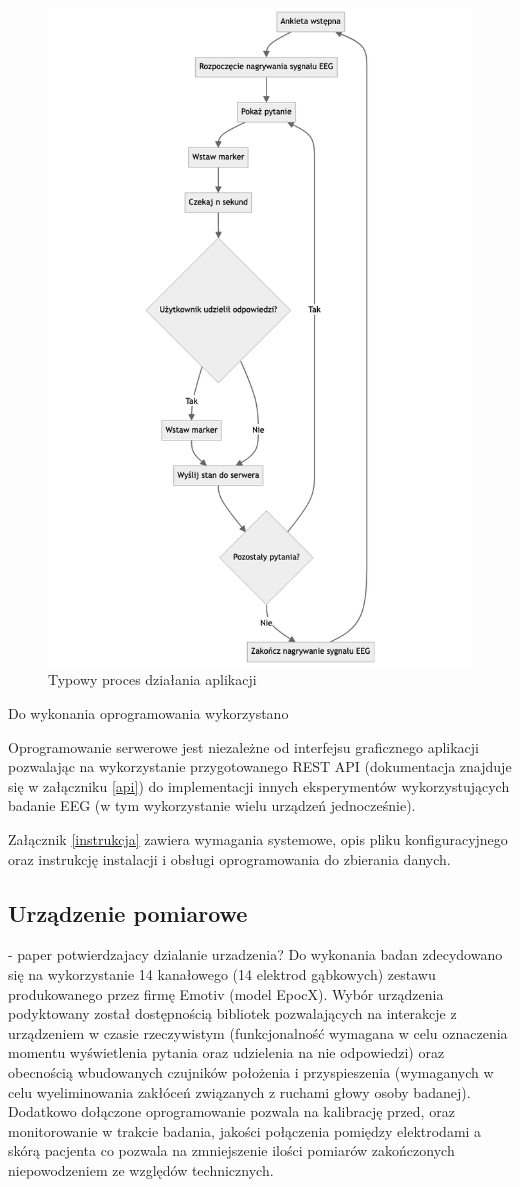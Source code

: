 \documentclass{./assets/wfis}
\begin{document}
\begin{figure}[h!]
    \centering
    \includegraphics[width=0.5\columnwidth]{thesis/assets/app_flow_diagram.png}
    \caption{Typowy proces działania aplikacji}
    \label{fig:app-flow}
\end{figure}

Do wykonania oprogramowania wykorzystano

Oprogramowanie serwerowe jest niezależne od interfejsu graficznego aplikacji pozwalając na wykorzystanie przygotowanego REST API (dokumentacja znajduje się w załączniku \ref{api}) do implementacji innych eksperymentów wykorzystujących badanie EEG (w tym wykorzystanie wielu urządzeń jednocześnie).

Załącznik \ref{instrukcja} zawiera wymagania systemowe, opis pliku konfiguracyjnego oraz instrukcję instalacji i obsługi oprogramowania do zbierania danych.

\subsection{Urządzenie pomiarowe}\label{emotiv}
- paper potwierdzajacy dzialanie urzadzenia?
Do wykonania badan zdecydowano się na wykorzystanie 14 kanałowego (14 elektrod gąbkowych)  zestawu produkowanego przez firmę Emotiv (model EpocX). Wybór urządzenia podyktowany został dostępnością bibliotek pozwalających na interakcje z urządzeniem w czasie rzeczywistym (funkcjonalność wymagana w celu oznaczenia momentu wyświetlenia pytania oraz udzielenia na nie odpowiedzi) oraz obecnością wbudowanych czujników położenia i przyspieszenia (wymaganych w celu wyeliminowania zakłóceń związanych z ruchami głowy osoby badanej). Dodatkowo dołączone oprogramowanie pozwala na kalibrację przed, oraz monitorowanie w trakcie badania, jakości połączenia pomiędzy elektrodami a skórą pacjenta co pozwala na zmniejszenie ilości pomiarów zakończonych niepowodzeniem ze względów technicznych.
\end{document}
